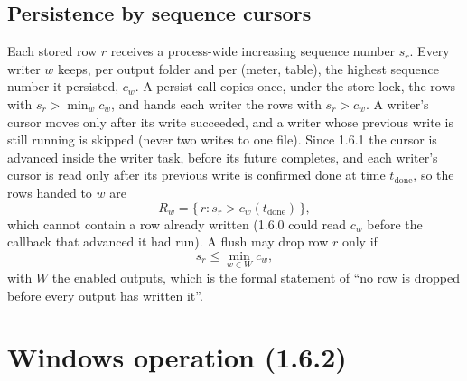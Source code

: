 \documentclass[11pt,a4paper]{article}
\begin{document}
\subsection{Persistence by sequence cursors}\label{sec:cursors}
Each stored row $r$ receives a process-wide increasing sequence number $s_r$.
Every writer $w$ keeps, per output folder and per (meter, table), the highest
sequence number it persisted, $c_w$. A persist call copies once, under the
store lock, the rows with $s_r > \min_w c_w$, and hands each writer the rows
with $s_r > c_w$. A writer's cursor moves only after its write succeeded, and a
writer whose previous write is still running is skipped (never two writes to
one file). Since 1.6.1 the cursor is advanced inside the writer task, before
its future completes, and each writer's cursor is read only after its previous
write is confirmed done at time $t_{\text{done}}$, so the rows handed to $w$ are
\begin{equation}
  R_w = \{\, r : s_r > c_w(t_{\text{done}}) \,\},
\end{equation}
which cannot contain a row already written (1.6.0 could read $c_w$ before the
callback that advanced it had run). A flush may drop row $r$ only if
\begin{equation}
  s_r \le \min_{w \in W} c_w ,
\end{equation}
with $W$ the enabled outputs, which is the formal statement of
``no row is dropped before every output has written it''.

\section{Windows operation (1.6.2)}\label{sec:windows}
\end{document}
